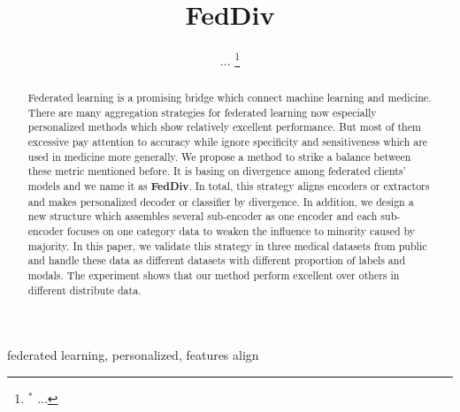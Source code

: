 \documentclass[journal]{IEEEtran}
\begin{document}
	
	
\title{FedDiv}


\author{...
	\thanks{$^{\ast}$ ...
	}
}

\maketitle

\begin{abstract}
Federated learning is a promising bridge which connect machine learning and medicine. There are many aggregation strategies for federated learning now especially personalized methods which show relatively excellent performance. But most of them excessive pay attention to accuracy while ignore specificity and sensitiveness which are used in medicine more generally. We propose a method to strike a balance between these metric mentioned before. It is basing on divergence among federated clients' models and we name it as \textbf{FedDiv}. In total, this strategy aligns encoders or extractors and makes personalized decoder or classifier by divergence. In addition, we design a new structure which assembles several sub-encoder as one encoder and each sub-encoder focuses on one category data to weaken the influence to minority caused by majority. In this paper, we validate this strategy in three medical datasets from public and handle these data as different datasets with different proportion of labels and modals. The experiment shows that our method perform excellent over others in different distribute data.
	
\end{abstract}

\begin{IEEEkeywords}
federated learning, personalized, features align
	
\end{IEEEkeywords}

\IEEEpeerreviewmaketitle
\end{document}
